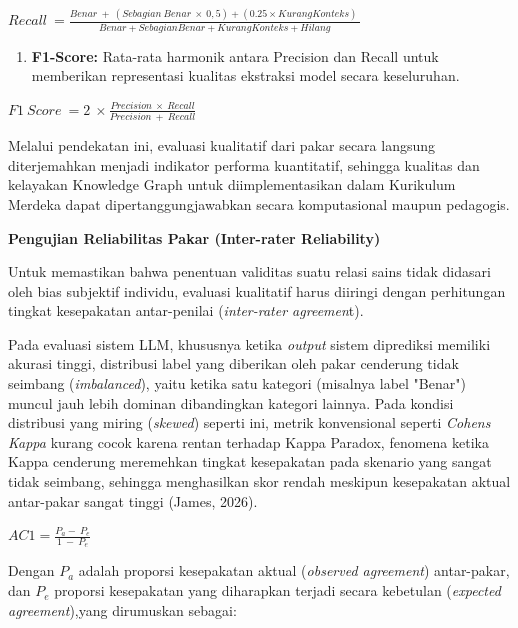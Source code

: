 \documentclass[
]{article}
\begin{document}
\(Recall\  = \frac{Benar\  + \ (Sebagian\ Benar\  \times \ 0,5) + (0.25 \times KurangKonteks)\ }{Benar + SebagianBenar + KurangKonteks + Hilang}\)

\begin{enumerate}
\def\labelenumi{\arabic{enumi}.}
\setcounter{enumi}{2}
\item
  \textbf{F1-Score:} Rata-rata harmonik antara Precision dan Recall
  untuk memberikan representasi kualitas ekstraksi model secara
  keseluruhan.
\end{enumerate}

\(F1\ Score\  = 2\  \times \frac{Precision\  \times \ Recall}{Precision\  + \ Recall}\)

Melalui pendekatan ini, evaluasi kualitatif dari pakar secara langsung
diterjemahkan menjadi indikator performa kuantitatif, sehingga kualitas
dan kelayakan Knowledge Graph untuk diimplementasikan dalam Kurikulum
Merdeka dapat dipertanggungjawabkan secara komputasional maupun
pedagogis.

\textbf{Pengujian Reliabilitas Pakar (Inter-rater Reliability)}

Untuk memastikan bahwa penentuan validitas suatu relasi sains tidak
didasari oleh bias subjektif individu, evaluasi kualitatif harus
diiringi dengan perhitungan tingkat kesepakatan antar-penilai
(\emph{inter-rater agreemen}t).

Pada evaluasi sistem LLM, khususnya ketika \emph{output} sistem
diprediksi memiliki akurasi tinggi, distribusi label yang diberikan oleh
pakar cenderung tidak seimbang (\emph{imbalanced}), yaitu ketika satu
kategori (misalnya label "Benar") muncul jauh lebih dominan dibandingkan
kategori lainnya. Pada kondisi distribusi yang miring (\emph{skewed})
seperti ini, metrik konvensional seperti \emph{Cohen\textquotesingle s
Kappa} kurang cocok karena rentan terhadap Kappa Paradox, fenomena
ketika Kappa cenderung meremehkan tingkat kesepakatan pada skenario yang
sangat tidak seimbang, sehingga menghasilkan skor rendah meskipun
kesepakatan aktual antar-pakar sangat tinggi (James, 2026).

\(AC1 = \frac{P_{a} - \ P_{e}}{1\  - \ P_{e}}\)

Dengan \(P_{a}\)\hspace{0pt} adalah proporsi kesepakatan aktual
(\emph{observed agreement}) antar-pakar, dan
\(P_{e}\)\hspace{0pt}\hspace{0pt} proporsi kesepakatan yang diharapkan
terjadi secara kebetulan (\emph{expected agreement}),yang dirumuskan
sebagai:
\end{document}
